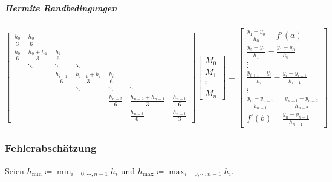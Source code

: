 \documentclass[a4paper, 11pt, accentcolor = tud3b]{tudreport}
\begin{document}
				\subparagraph{Hermite Randbedingungen}
				\begin{equation*}
					\begin{bmatrix}
						\frac{h_0}{3} & \frac{h_0}{6}       &  \\
						\frac{h_0}{6} & \frac{h_0 + h_1}{3} & \frac{h_1}{6}       &  \\
						              & \ddots              & \ddots              & \ddots                  &  \\
						              &                     & \frac{h_{i - 1}}{6} & \frac{h_{i-1} + h_i}{3} & \frac{h_i}{6}     &  \\
						              &                     &                     & \ddots                  & \ddots            & \ddots                    &  \\
						              &                     &                     &                         & \frac{h_{n-2}}{6} & \frac{h_{n-2}+h_{n-1}}{3} & \frac{h_{n-1}}{6} \\
						              &                     &                     &                         &                   & \frac{h_{n-1}}{6}         & \frac{h_{n-1}}{3}
					\end{bmatrix}
					\begin{bmatrix}
						M_0    \\
						M_1    \\
						\vdots \\
						M_n
					\end{bmatrix}
					=
					\begin{bmatrix}
						\frac{y_1-y_0}{h_0} - f'(a)                                     \\
						\frac{y_2 - y_1}{h_1} - \frac{y_1 - y_0}{h_0}                   \\
						\vdots                                                          \\
						\frac{y_{i+1} - y_i}{h_i} - \frac{y_i - y_{i-1}}{h_{i-1}}       \\
						\vdots                                                          \\
						\frac{y_n - y_{n-1}}{h_{n-1}} - \frac{y_{n-1}-y_{n-2}}{h_{n-2}} \\
						f'(b) - \frac{y_n-y_{n-1}}{h_{n-1}}
					\end{bmatrix}
				\end{equation*}
				
				\subsubsection{Fehlerabschätzung}
					Seien \( h_\textrm{min} \coloneqq \min_{i = 0, \cdots, n - 1} h_i \) und \( h_\textrm{max} \coloneqq \max_{i = 0, \cdots, n - 1} h_i \).
					
\end{document}
